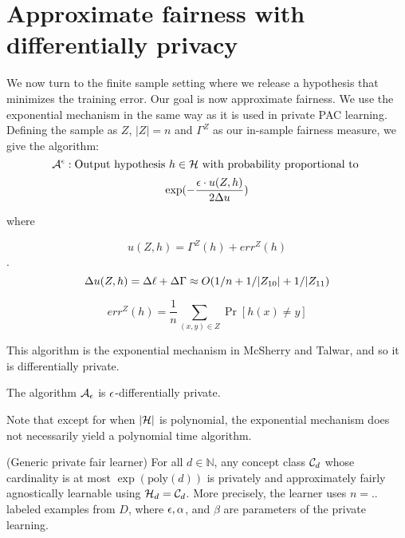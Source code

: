 
\section{Approximate fairness with differentially privacy}



We now turn to the finite sample setting where we release a hypothesis
that minimizes the training error. Our goal is now approximate
fairness. We use the exponential mechanism in the same way as it is
used in private PAC learning. Defining the sample as $Z$, $|Z| = n$ and
$\Gamma^{Z}$ as our in-sample fairness measure, we give the algorithm:
$$\mathcal{A}^\epsilon : \text{Output hypothesis }h \in \mathcal{H} \text{
	with probability proportional to }$$
\begin{align}
\exp(-\frac{\epsilon \cdot u(Z,h)}{2\Delta u})
\end{align}

where

$$u(Z,h) = \Gamma^Z(h) + err^Z(h)$$.
$$\Delta u(Z,h) = \Delta\ell + \Delta{\Gamma} \approx O(1/n+1/|Z_{10}|+1/|Z_{11})$$

$$err^Z(h) = \frac{1}{n} \sum_{(x,y) \in Z}\Pr[h(x) \neq y]$$



This algorithm is the exponential mechanism in McSherry and Talwar, and so it is differentially private.

\begin{lemma}
	The algorithm $\mathcal{A}_\epsilon$ is $\epsilon$-differentially private.
\end{lemma}

Note that except for when $|\mathcal{H}|$ is polynomial, the exponential
mechanism does not necessarily yield a polynomial time algorithm.


\begin{theorem}
	(Generic private fair learner) For all $d \in \mathbb{N}$, any
	concept class $\mathcal{C}_d$ whose cardinality is at most
	$\exp(\text{poly}(d))$ is privately and approximately fairly
	agnostically learnable using $\mathcal{H}_d = \mathcal{C}_d$. More precisely, the
	learner uses $n = ..$ labeled examples from $D$, where $\epsilon,
	\alpha$, and $\beta$ are parameters of the private learning.
\end{theorem}

